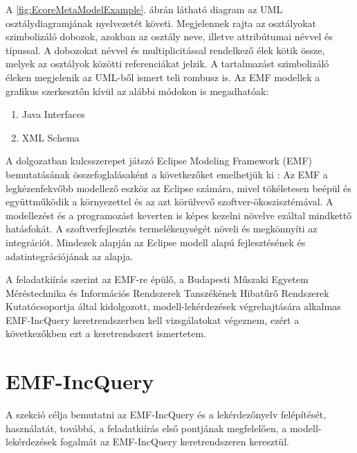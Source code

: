 A \ref{fig:EcoreMetaModelExample}. ábrán látható diagram az \gls{UML} osztálydiagramjának nyelvezetét követi.
Megjelennek rajta az osztályokat szimbolizáló dobozok, azokban az osztály neve, illetve attribútumai névvel és típussal.
A dobozokat névvel és multiplicitással rendelkező élek kötik össze, melyek az osztályok közötti referenciákat jelzik.
A tartalmazást szimbolizáló éleken megjelenik az UML-ből ismert teli rombusz is.
Az \gls{EMF} modellek a grafikus szerkesztőn kívül az alábbi módokon is megadhatóak:
\begin{enumerate}
	\item Java Interfaces
	\item XML Schema
\end{enumerate}

A dolgozatban kulcsszerepet játszó Eclipse Modeling Framework (\gls{EMF}) bemutatásának összefoglalásaként a következőket emelhetjük ki \cite{EMFFundamentals}:
Az \gls{EMF} a legkézenfekvőbb modellező eszköz az Eclipse számára, mivel tökéletesen beépül és együttműködik a környezettel és az azt körülvevő szoftver-ökoszisztémával.
A modellezést és a programozást keverten is képes kezelni növelve ezáltal mindkettő hatásfokát.
A szoftverfejlesztés termelékenységét növeli és megkönnyíti az integrációt.
Mindezek alapján az Eclipse modell alapú fejlesztésének és adatintegrációjának az alapja. 

A feladatkiírás szerint az \gls{EMF}-re épülő, a Budapesti Műszaki Egyetem Méréstechnika és Információs Rendszerek Tanszékének Hibatűrő Rendszerek Kutatócsoportja által kidolgozott, modell-lekérdezések végrehajtására alkalmas EMF-IncQuery keretrendszerben kell vizsgálatokat végeznem, ezért a következőkben ezt a keretrendszert ismertetem.


\section{EMF-IncQuery}\label{sect:IncQuery}

A szekció célja bemutatni az EMF-IncQuery és a lekérdezőnyelv felépítését, használatát, továbbá, a feladatkiírás első pontjának megfelelően, a modell-lekérdezések fogalmát az EMF-IncQuery keretrendszeren keresztül.

